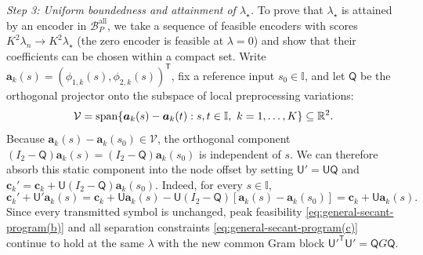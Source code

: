 \documentclass[journal,12pt,onecolumn,draftclsnofoot]{IEEEtran}
\newcommand{\T}{\mathsf T}\newcommand{\suc}{\succeq}
\begin{document}
\emph{Step 3: Uniform boundedness and attainment of $\lambda_\star$.}
To prove that $\lambda_\star$ is attained by an encoder in $\mathcal B_P^{\mathrm{all}}$, we take a sequence of feasible encoders with scores $K^2\lambda_n\to K^2\lambda_\star$ (the zero encoder is feasible at $\lambda=0$) and show that their coefficients can be chosen within a compact set.
Write $\boldsymbol a_k(s)=(\phi_{1,k}(s),\phi_{2,k}(s))^\T$, fix a reference input $s_0\in\mathbb I$, and let $\mathsf Q$ be the orthogonal projector onto the subspace of local preprocessing variations:
$$
\mathcal V=\operatorname{span}\{
\boldsymbol a_k(s)-\boldsymbol a_k(t):
s,t\in\mathbb I,\ k=1,\ldots,K\}\subseteq\mathbb R^2.
$$
Because $\boldsymbol a_k(s)-\boldsymbol a_k(s_0)\in\mathcal V$, the orthogonal component $(I_2-\mathsf Q)\boldsymbol a_k(s)=(I_2-\mathsf Q)\boldsymbol a_k(s_0)$ is independent of $s$. We can therefore absorb this static component into the node offset by setting $\mathsf U'=\mathsf U\mathsf Q$ and $\boldsymbol c_k'=\boldsymbol c_k+\mathsf U(I_2-\mathsf Q)\boldsymbol a_k(s_0)$. Indeed, for every $s\in\mathbb I$,
$$
\boldsymbol c_k'+\mathsf U'\boldsymbol a_k(s)
=\boldsymbol c_k+\mathsf U\boldsymbol a_k(s)
-\mathsf U(I_2-\mathsf Q)[\boldsymbol a_k(s)-\boldsymbol a_k(s_0)]
=\boldsymbol c_k+\mathsf U\boldsymbol a_k(s).
$$
Since every transmitted symbol is unchanged, peak feasibility \eqref{eq:general-secant-program(b)} and all separation constraints \eqref{eq:general-secant-program(c)} continue to hold at the same $\lambda$ with the new common Gram block $\mathsf U'^\T\mathsf U'=\mathsf QG\mathsf Q$.
\end{document}
